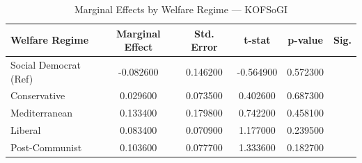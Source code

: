 \begin{table}[htbp]
\caption{Marginal Effects by Welfare Regime — KOFSoGI}
\label{tab:marginal_effects_KOFSoGI}
\begin{tabular}{lccccc}
\toprule
Welfare Regime & Marginal Effect & Std. Error & t-stat & p-value & Sig. \\
\midrule
Social Democrat (Ref) & -0.082600 & 0.146200 & -0.564900 & 0.572300 &  \\
Conservative & 0.029600 & 0.073500 & 0.402600 & 0.687300 &  \\
Mediterranean & 0.133400 & 0.179800 & 0.742200 & 0.458100 &  \\
Liberal & 0.083400 & 0.070900 & 1.177000 & 0.239500 &  \\
Post-Communist & 0.103600 & 0.077700 & 1.333600 & 0.182700 &  \\
\bottomrule
\end{tabular}
\end{table}
